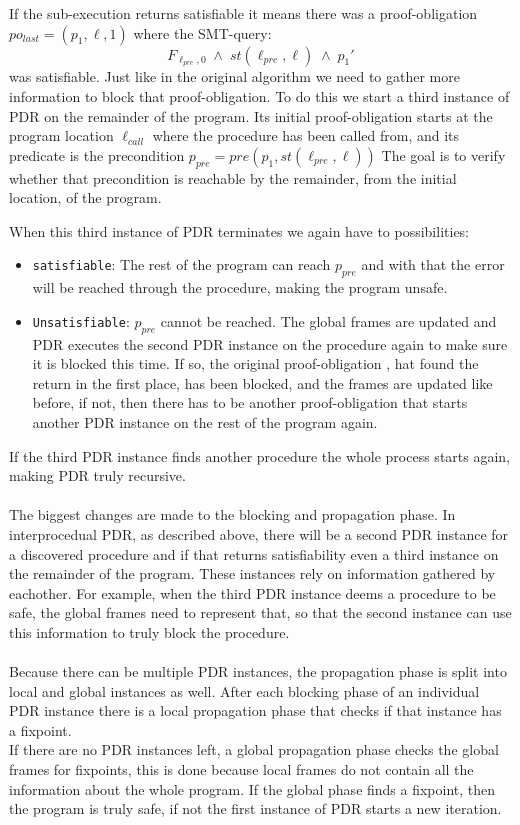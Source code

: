 \documentclass{article}
\begin{document}
	If the sub-execution returns satisfiable it means there was a proof-obligation $po_{last} = (p_1, \ell, 1)$ where the SMT-query:
	\begin{equation}
		F_{\ell_{pre}, 0} \; \land \; st(\ell_{pre}, \ell) \; \land \; p_1'
	\end{equation}
	was satisfiable. Just like in the original algorithm we need to gather more information to block that proof-obligation. To do this we start a third instance of PDR on the remainder of the program. Its initial proof-obligation starts at the program location $\ell_{call}$ where the procedure has been called from, and its predicate is the precondition $p_{pre} = pre(p_1, st(\ell_{pre}, \ell))$
	The goal is to verify whether that precondition is reachable by the remainder, from the initial location, of the program. \\ \par
	When this third instance of PDR terminates we again have to possibilities: 
	\begin{itemize}
		\item \texttt{satisfiable}: The rest of the program can reach $p_{pre}$ and with that the error will be reached through the procedure, making the program unsafe.
		\item \texttt{Unsatisfiable}: $p_{pre}$ cannot be reached. The global frames are updated and PDR executes the second PDR instance on the procedure again to make sure it is blocked this time. If so, the original proof-obligation , hat found the return in the first place, has been blocked, and the frames are updated like before, if not, then there has to be another proof-obligation that starts another PDR instance on the rest of the program again.
	\end{itemize}
	If the third PDR instance finds another procedure the whole process starts again, making PDR truly recursive. \\ \\
	
	The biggest changes are made to the blocking and propagation phase. In interprocedual PDR, as described above, there will be a second PDR instance for a discovered procedure and if that returns satisfiability even a third instance on the remainder of the program. These instances rely on information gathered by eachother. For example, when the third PDR instance deems a procedure to be safe, the global frames need to represent that, so that the second instance can use this information to truly block the procedure. \\ \\
	Because there can be multiple PDR instances, the propagation phase is split into local and global instances as well. After each blocking phase of an individual PDR instance there is a local propagation phase that checks if that instance has a fixpoint. \\
	If there are no PDR instances left, a global propagation phase checks the global frames for fixpoints, this is done because local frames do not contain all the information about the whole program. If the global phase finds a fixpoint, then the program is truly safe, if not the first instance of PDR starts a new iteration.
	
\end{document}
